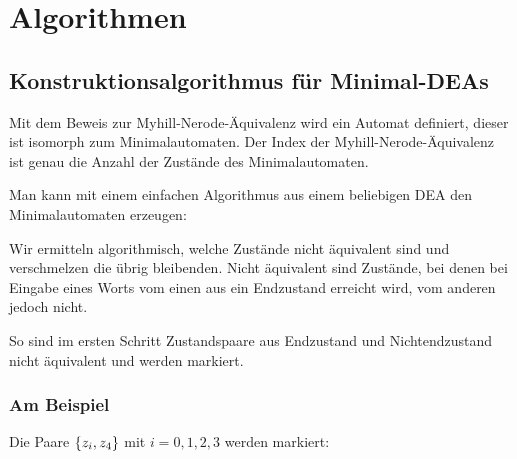 \chapter{Algorithmen}
\section{Konstruktionsalgorithmus für Minimal-DEAs}
Mit dem Beweis zur Myhill-Nerode-Äquivalenz wird ein Automat definiert, dieser ist isomorph zum Minimalautomaten.
Der Index der Myhill-Nerode-Äquivalenz ist genau die Anzahl der Zustände des Minimalautomaten.

Man kann mit einem einfachen Algorithmus aus einem beliebigen DEA den Minimalautomaten erzeugen:

Wir ermitteln algorithmisch, welche Zustände nicht äquivalent sind und verschmelzen die übrig bleibenden.
Nicht äquivalent sind Zustände, bei denen bei Eingabe eines Worts vom einen aus ein Endzustand erreicht wird, vom anderen jedoch nicht.

So sind im ersten Schritt Zustandspaare aus Endzustand und Nichtendzustand nicht äquivalent und werden markiert.

\subsection*{Am Beispiel}

\vspace{1em}


Die Paare $\left\{ z_i,z_4 \right\}$ mit $i=0,1,2,3$ werden markiert:

